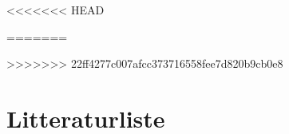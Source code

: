 % 



\pagestyle{empty} %

\pagestyle{fancy} %
\tableofcontents

<<<<<<< HEAD

=======


>>>>>>> 22ff4277c007afcc373716558fee7d820b9cb0e8
%
%
%
%
%
%

\chapter{Litteraturliste}
\printbibliography[heading=none]

